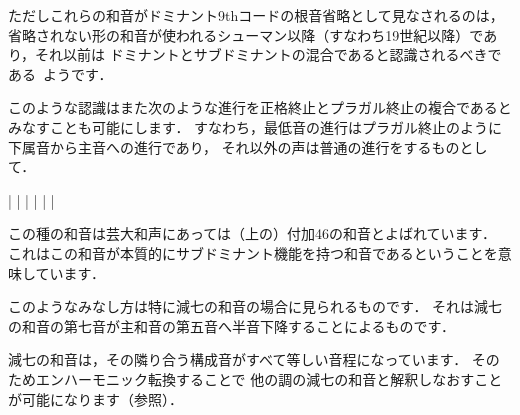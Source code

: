 \documentclass[dvipdfmx,uplatex,b5paper,openany,jbase=12Q,nomag*,textwidth-limit=44%
               ]{gachimuchi}[2020/05/05]
\begin{document}
\begin{Yodan}
ただしこれらの和音がドミナント\supsc{(\txFlat)}9thコードの根音省略として見なされるのは，
省略されない形の和音が使われるシューマン以降（すなわち19世紀以降）であり，それ以前は
ドミナントとサブドミナントの混合であると認識されるべきである~\cite{chDIETHER1}ようです．

\begin{Music}[0.6\linewidth]
  \nostartrule%
  \Startpiece%
  \NOtes%
  \en{}\changecontext%
  \NOtes%
  \en%
  \endpiece%
\end{Music}

このような認識はまた次のような進行を正格終止とプラガル終止の複合であるとみなすことも可能にします．
すなわち，最低音の進行はプラガル終止のように下属音から主音への進行であり，
それ以外の声は普通の進行をするものとして．

\begin{Music}[0.6\linewidth]
  \Startpiece%
  \NOTEs%
  |%
  \en\bar%
  \NOTEs%
  |%
  \en{}\setdoublebar\changecontext%
  \NOTEs%
  |%
  \en\bar%
  \NOTEs%
  |%
  \en\setdoublebar%
  \endpiece%
\end{Music}

この種の和音は芸大和声にあっては（\Gniv 上の）付加\subsupsc46の和音とよばれています\cite[p.91]{chSHIMAOKA1ii}．
これはこの和音が本質的にサブドミナント機能を持つ和音であるということを意味しています．

このようなみなし方は特に減七の和音の場合に見られるものです．
それは減七の和音の第七音が主和音の第五音へ半音下降することによるものです．

\end{Yodan}

減七の和音は，その隣り合う構成音がすべて等しい音程になっています．
そのためエンハーモニック転換することで
他の調の減七の和音と解釈しなおすことが可能になります（参照）．
\end{document}
